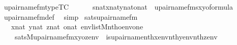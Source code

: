\begin{isabellebody}
\isanewline
{}\isamarkupfalse%
\ upair{\isacharunderscore}{\kern0pt}name{\isacharunderscore}{\kern0pt}fm{\isacharunderscore}{\kern0pt}type{\isacharbrackleft}{\kern0pt}TC{\isacharbrackright}{\kern0pt}\ {\isacharcolon}{\kern0pt}\isanewline
\ \ \ \ {\isachardoublequoteopen}{\isasymlbrakk}\ s{\isasymin}nat{\isacharsemicolon}{\kern0pt}x{\isasymin}nat{\isacharsemicolon}{\kern0pt}y{\isasymin}nat{\isacharsemicolon}{\kern0pt}o{\isasymin}nat{\isasymrbrakk}\ {\isasymLongrightarrow}\ upair{\isacharunderscore}{\kern0pt}name{\isacharunderscore}{\kern0pt}fm{\isacharparenleft}{\kern0pt}s{\isacharcomma}{\kern0pt}x{\isacharcomma}{\kern0pt}y{\isacharcomma}{\kern0pt}o{\isacharparenright}{\kern0pt}{\isasymin}formula{\isachardoublequoteclose}\isanewline
%
\isadelimproof
\ \ %
\endisadelimproof
%
\isatagproof
{}\isamarkupfalse%
\ upair{\isacharunderscore}{\kern0pt}name{\isacharunderscore}{\kern0pt}fm{\isacharunderscore}{\kern0pt}def\ \isamarkupfalse%
\ simp%
\endisatagproof
{\isafoldproof}%
%
\isadelimproof
\isanewline
%
\endisadelimproof
\isanewline
{}\isamarkupfalse%
\ sats{\isacharunderscore}{\kern0pt}upair{\isacharunderscore}{\kern0pt}name{\isacharunderscore}{\kern0pt}fm\ {\isacharcolon}{\kern0pt}\isanewline
\ \ \ {\isachardoublequoteopen}x{\isasymin}nat{\isachardoublequoteclose}\ {\isachardoublequoteopen}y{\isasymin}nat{\isachardoublequoteclose}\ {\isachardoublequoteopen}z{\isasymin}nat{\isachardoublequoteclose}\ {\isachardoublequoteopen}o{\isasymin}nat{\isachardoublequoteclose}\ {\isachardoublequoteopen}env{\isasymin}list{\isacharparenleft}{\kern0pt}M{\isacharparenright}{\kern0pt}{\isachardoublequoteclose}{\isachardoublequoteopen}nth{\isacharparenleft}{\kern0pt}o{\isacharcomma}{\kern0pt}env{\isacharparenright}{\kern0pt}{\isacharequal}{\kern0pt}one{\isachardoublequoteclose}\ \isanewline
\ \ \ \isanewline
\ \ \ \ {\isachardoublequoteopen}sats{\isacharparenleft}{\kern0pt}M{\isacharcomma}{\kern0pt}upair{\isacharunderscore}{\kern0pt}name{\isacharunderscore}{\kern0pt}fm{\isacharparenleft}{\kern0pt}x{\isacharcomma}{\kern0pt}y{\isacharcomma}{\kern0pt}o{\isacharcomma}{\kern0pt}z{\isacharparenright}{\kern0pt}{\isacharcomma}{\kern0pt}env{\isacharparenright}{\kern0pt}\ {\isasymlongleftrightarrow}\ is{\isacharunderscore}{\kern0pt}upair{\isacharunderscore}{\kern0pt}name{\isacharparenleft}{\kern0pt}nth{\isacharparenleft}{\kern0pt}x{\isacharcomma}{\kern0pt}env{\isacharparenright}{\kern0pt}{\isacharcomma}{\kern0pt}nth{\isacharparenleft}{\kern0pt}y{\isacharcomma}{\kern0pt}env{\isacharparenright}{\kern0pt}{\isacharcomma}{\kern0pt}nth{\isacharparenleft}{\kern0pt}z{\isacharcomma}{\kern0pt}env{\isacharparenright}{\kern0pt}{\isacharparenright}{\kern0pt}{\isachardoublequoteclose}\isanewline

\end{isabellebody}
